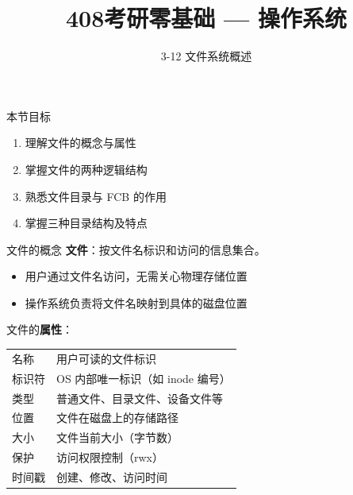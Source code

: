 \documentclass[10pt, aspectratio=169]{beamer}
\title{408考研零基础 --- 操作系统}
\subtitle{3-12 文件系统概述}
\author{}
\date{}
\begin{document}
\begin{frame}{本节目标}
    \begin{enumerate}
        \item 理解文件的概念与属性
        \item 掌握文件的两种逻辑结构
        \item 熟悉文件目录与 FCB 的作用
        \item 掌握三种目录结构及特点
    \end{enumerate}
\end{frame}

\begin{frame}{文件的概念}
    \textbf{文件}：按文件名标识和访问的信息集合。
    \vspace{0.5em}
    \begin{itemize}
        \item 用户通过文件名访问，无需关心物理存储位置
        \item 操作系统负责将文件名映射到具体的磁盘位置
    \end{itemize}
    \vspace{0.5em}
    文件的\textbf{属性}：
    \begin{center}
        \begin{tabular}{|l|l|}
            \hline
            名称 & 用户可读的文件标识 \\
            标识符 & OS 内部唯一标识（如 inode 编号） \\
            类型 & 普通文件、目录文件、设备文件等 \\
            位置 & 文件在磁盘上的存储路径 \\
            大小 & 文件当前大小（字节数） \\
            保护 & 访问权限控制（rwx） \\
            时间戳 & 创建、修改、访问时间 \\
            \hline
        \end{tabular}
    \end{center}
\end{frame}
\end{document}
